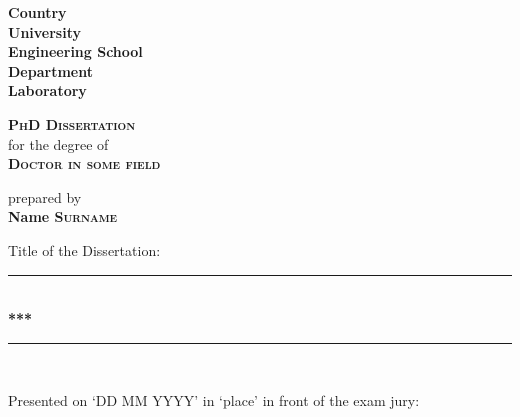 \begin{titlepage}
 \newcommand{\HRule}{\rule{\linewidth}{0.35mm}} %
 \begin{flushleft}
  {\scriptsize
   \textbf{\large{Country}}\\
   \textbf{\large{University}}\\
   \textbf{\large{Engineering School}}\\
   \textbf{\large{Department}}\\
   \textbf{\large{Laboratory}}}
 \end{flushleft}
 \begin{center}
  \textbf{\textsc{\huge{PhD Dissertation}}}\\
  for the degree of\\
  \textbf{\textsc{\large{Doctor in some field}}}\\
 \end{center}
 \begin{center}
  prepared by\\
  \textbf{{\large Name \textsc{Surname}}}\\
 \end{center}
 \begin{center}
  Title of the Dissertation:\\
  \HRule \\[0.3cm]
  \Huge{\textbf{***}}\\[0.2cm]
  \HRule \\%
 \end{center}
 \begin{center}
  Presented on `DD MM YYYY' in `place' in front of the exam jury:\\

\end{center}
\end{titlepage}
